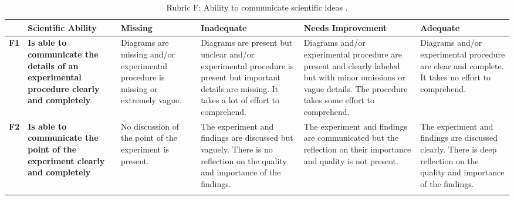 \begin{landscape}
\begin{longtable}{>{\bfseries}p{0.02\textheight}|>{\bfseries\RaggedRight}p{0.25\textheight}|>{\RaggedRight}p{0.21\textheight}|>{\RaggedRight}p{0.21\textheight}|>{\RaggedRight}p{0.22\textheight}|>{\RaggedRight}p{0.22\textheight}}
	\toprule
	& Scientific Ability
	& Missing & Inadequate & Needs Improvement & Adequate \\ \midrule \endhead	
	F1
	& Is able to communicate the details of an experimental procedure clearly and completely
	& Diagrams are missing and/or experimental procedure is missing or extremely vague.
	& Diagrams are present but unclear and/or experimental procedure is present but important details are missing. It takes a lot of effort to comprehend.
	& Diagrams and/or experimental procedure are present and clearly labeled but with minor omissions or vague details. The procedure takes some effort to comprehend.
	& Diagrams and/or experimental procedure are clear and complete. It takes no effort to comprehend.
	\\ \midrule
	F2
	& Is able to communicate the point of the experiment clearly and completely
	& No discussion of the point of the experiment is present.
	& The experiment and findings are discussed but vaguely. There is no reflection on the quality and importance of the findings.
	& The experiment and findings are communicated but the reflection on their importance and quality is not present.
	& The experiment and findings are discussed clearly. There is deep reflection on the quality and importance of the findings.
	\\
	\bottomrule
	\caption{Rubric F: Ability to communicate scientific ideas \cite{etkina_scientific_2006}.}\label{rubric:f}
\end{longtable}


\end{landscape}
